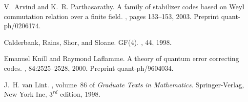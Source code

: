 \documentclass[11pt,twoside]{article}
\theoremstyle{definition}
\theoremstyle{remark}
\begin{document}
\begin{thebibliography}{1}

V.~Arvind and K.~R. Parthasarathy.
\newblock A family of stabilizer codes based on {Weyl} commutation relation
  over a finite field.
, pages
  133--153, 2003.
\newblock Preprint quant-ph/0206174.

Calderbank, Rains, Shor, and Sloane.
 {GF(4)}.
, 44, 1998.

Emanuel Knill and Raymond Laflamme.
\newblock A theory of quantum error correcting codes.
, 84:2525--2528, 2000.
\newblock Preprint quant-ph/9604034.

J.~H. van Lint.
, volume~86 of {\em Graduate
  Texts in Mathematics}.
\newblock Springer-Verlag, New York Inc, $3^{rd}$ edition, 1998.

\end{thebibliography}
\end{document}
